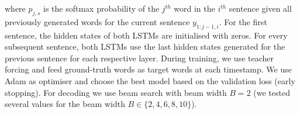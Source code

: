 \documentclass[11pt,a4paper]{article}
\begin{document}
where $p_{j,s}$ is the softmax probability of the $j^{th}$ word in the $i^{th}$ sentence given all previously generated words for the current sentence $y_{1:j-1,i}$.
For the first sentence, the hidden states of both LSTMs are initialised with zeros.
For every subsequent sentence, both LSTMs use the last hidden states generated for the previous sentence for each respective layer.
During training, we use teacher forcing and feed ground-truth words as target words at each timestamp.
We use Adam \cite{adam14} as optimiser and choose the best model based on the validation loss (early stopping).
For decoding we use beam search \cite{beam17} with beam width $B=2$ (we tested several values for the beam width $B \in \{2, 4, 6, 8, 10\}$).








\end{document}
